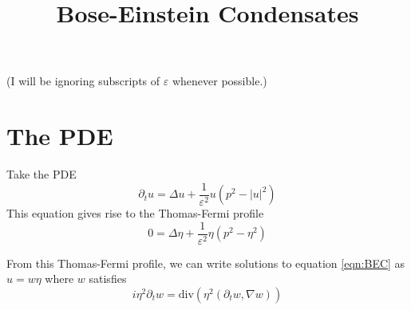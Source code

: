 \documentclass[a4paper]{article}
\title{Bose-Einstein Condensates }
\date{}
\author{}
\renewcommand{\div}{\mathrm{div}}
\begin{document}
\maketitle

(I will be ignoring subscripts of $\varepsilon$ whenever possible.)

\section{The PDE}
Take the PDE
\begin{equation} \label{eqn:BEC}
  \partial_t u = \Delta u + \frac{1}{\varepsilon^2}u (p^2 - |u|^2)
\end{equation}
This equation gives rise to the Thomas-Fermi profile
\begin{equation} \label{eqn:TF}
  0 = \Delta \eta + \frac{1}{\varepsilon^2} \eta( p^2 - \eta^2 )
\end{equation}

From this Thomas-Fermi profile, we can write solutions to equation \eqref{eqn:BEC} as $u = w \eta$ where $w$ satisfies
\begin{equation} \label{eqn:w}
  i \eta^2 \partial_t w = \div (\eta^2 (\partial_t w, \nabla w))
\end{equation}
\end{document}

